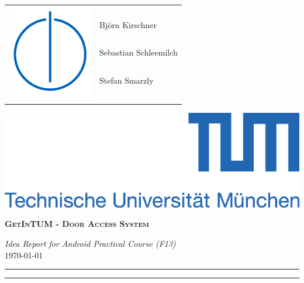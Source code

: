 \documentclass[a4paper,12pt]{article}
\begin{document}
\noindent %
\begin{minipage}{0.5\textwidth}
\begin{flushleft}
	\begin{tabular}{lm{6cm}}
	\multirow{5}{*}{\includegraphics[scale=1]{images/IN_logo.png}} \\
	 & Bj\"{o}rn Kirschner \\
	 & Sebastian Schleemilch \\
	 & Stefan Smarzly \\
	 & \\
	 & \\
	\end{tabular}
\end{flushleft}
\end{minipage}
\hfill
\begin{minipage}{0.5\textwidth}
\begin{flushright}
	\includegraphics[scale=1]{images/tum_logo.png}
\end{flushright}
\end{minipage}

\begin{center}
{\LARGE\textbf{\textsc{GetInTUM - Door Access System}}}

\large \textit{Idea Report for Android Practical Course (F13)} \\
\large \today
\end{center}

\bigskip
\bigskip

\hrule
\bigskip
\bigskip

\newpage
\bigskip
\tableofcontents

\bigskip
\bigskip
\bigskip
\hrule







\end{document}

